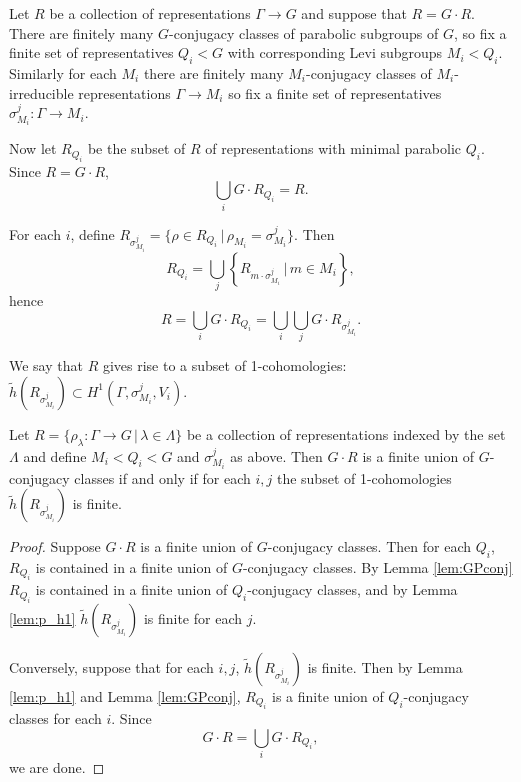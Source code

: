 Let $R$ be a collection of representations $\Gamma \rightarrow G$ and suppose that $R = G \cdot R$. There are finitely many $G$-conjugacy classes of parabolic subgroups of $G$, so fix a finite set of representatives $Q_i < G$ with corresponding Levi subgroups $M_i < Q_i$. Similarly for each $M_i$ there are finitely many $M_i$-conjugacy classes of $M_i$-irreducible representations $\Gamma \rightarrow M_i$ so fix a finite set of representatives $\sigma_{M_i}^j : \Gamma \rightarrow M_i$. 

Now let $R_{Q_i}$ be the subset of $R$ of representations with minimal parabolic $Q_i$. Since $R = G \cdot R$,
\begin{displaymath}
  \bigcup_i G \cdot R_{Q_i} = R.
\end{displaymath}

For each $i$, define $R_{\sigma_{M_i}^j} = \{\rho \in R_{Q_i}\, | \, \rho_{M_i} = \sigma_{M_i}^j\}$. Then
\begin{displaymath}
  R_{Q_i} = \bigcup_j \left\{ R_{m \cdot \sigma_{M_i}^j} \, | \, m \in M_i \right\},
\end{displaymath}
hence
\begin{displaymath}
  R = \bigcup_i G \cdot R_{Q_i} = \bigcup_i \bigcup_j G \cdot R_{\sigma_{M_i}^j}. 
\end{displaymath}

We say that $R$ gives rise to a subset of 1-cohomologies: $\tilde{h}(R_{\sigma_{M_i}^j}) \subset H^1(\Gamma, \sigma_{M_i}^j, V_i)$.

\begin{theorem}
  Let $R=\{\rho_\lambda:\Gamma\rightarrow G\,|\,\lambda \in \Lambda\}$ be a collection of representations indexed by the set $\Lambda$ and define $M_i < Q_i < G$ and $\sigma_{M_i}^{j}$ as above. Then $G \cdot R$ is a finite union of $G$-conjugacy classes if and only if for each $i,j$ the subset of 1-cohomologies $\tilde{h}(R_{\sigma_{M_i}^j})$ is finite.
  \label{thm:g_h1}
\end{theorem}
\begin{proof}
  Suppose $G \cdot R$ is a finite union of $G$-conjugacy classes. Then for each $Q_i$, $R_{Q_i}$ is contained in a finite union of $G$-conjugacy classes. By Lemma \ref{lem:GPconj} $R_{Q_i}$ is contained in a finite union of $Q_i$-conjugacy classes, and by Lemma \ref{lem:p_h1} $\tilde{h}(R_{\sigma_{M_i}^j})$ is finite for each $j$.

  Conversely, suppose that for each $i, j$, $\tilde{h}(R_{\sigma_{M_i}^j})$ is finite. Then by Lemma \ref{lem:p_h1} and Lemma \ref{lem:GPconj}, $R_{Q_i}$ is a finite union of $Q_i$-conjugacy classes for each $i$. Since
  \begin{displaymath}
    G \cdot R = \bigcup_i G \cdot R_{Q_i},
  \end{displaymath}
  we are done.
\end{proof}

